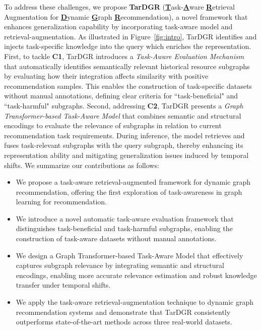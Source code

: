 \documentclass[letterpaper]{article} %
\begin{document}
To address these challenges, we propose \textbf{TarDGR} (\textbf{\underline{T}}ask-\textbf{\underline{A}}ware \textbf{\underline{R}}etrieval Augmentation for \textbf{\underline{D}}ynamic \textbf{\underline{G}}raph \textbf{\underline{R}}ecommendation), 
a novel framework that enhances generalization capability by incorporating task-aware model and retrieval-augmentation. As illustrated in Figure~\ref{fig:intro}, TarDGR identifies and injects task-specific knowledge into the query which enriches the representation.
First, to tackle \textbf{C1}, TarDGR introduces a \textit{Task-Aware Evaluation Mechanism} that automatically identifies semantically relevant historical resource subgraphs by evaluating how their integration affects similarity with positive recommendation samples. This enables the construction of task-specific datasets without manual annotations, defining clear criteria for ``task-beneficial" and ``task-harmful" subgraphs. Second, addressing \textbf{C2}, TarDGR presents a \textit{Graph Transformer-based Task-Aware Model} that combines semantic and structural encodings to evaluate the relevance of subgraphs in relation to current recommendation task requirements. 
During inference, the model retrieves and fuses task-relevant subgraphs with the query subgraph, thereby enhancing its representation ability and mitigating generalization issues induced by temporal shifts. 
We summarize our contributions as follows:
\begin{itemize}
\item We propose a task-aware retrieval-augmented framework for dynamic graph recommendation, offering the first exploration of task-awareness in graph learning for recommendation.
\item We introduce a novel automatic task-aware evaluation framework that distinguishes task-beneficial and task-harmful subgraphs, enabling the construction of task-aware datasets without manual annotations.
\item We design a Graph Transformer-based Task-Aware Model that effectively captures subgraph relevance by integrating semantic and structural encodings, enabling more accurate relevance estimation and robust knowledge transfer under temporal shifts. 
\item We apply the task-aware retrieval-augmentation technique to dynamic graph recommendation systems and demonstrate that TarDGR consistently outperforms state-of-the-art methods across three real-world datasets.
\end{itemize}
\end{document}
